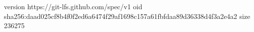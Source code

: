 version https://git-lfs.github.com/spec/v1
oid sha256:daad025cf8b4f0f2ed6a6474f29af1698c157a61fbfdaa89d36338d4f3a2e4a2
size 236275
